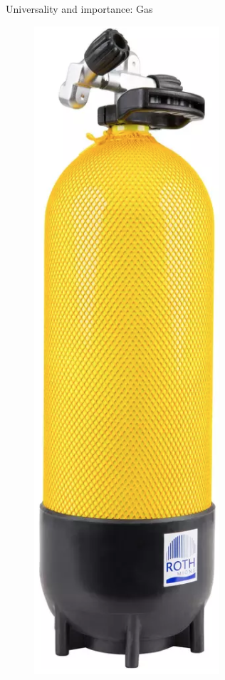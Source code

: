\documentclass[usenames,dvipsnames]{beamer}
\begin{document}
\begin{frame}{\huge{Universality and importance: Gas}}
\begin{figure}
          \includegraphics[scale=0.25]{Images/diving_tank.png}

\end{figure}
\end{frame}
\end{document}
